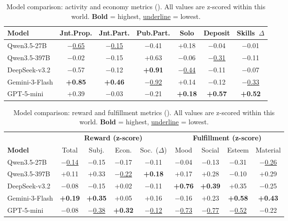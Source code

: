 \begin{table}[t]
\centering
\caption{Model comparison: activity and economy metrics (\campus{}).
All values are z-scored within this world.
\textbf{Bold} = highest, \underline{underline} = lowest.}
\label{tab:model_campus_activity}
\begin{tabular}{l c c c c c c}
\toprule
\textbf{Model} & Jnt.Prop. & Jnt.Part. & Pub.Part. & Solo & Deposit & Skills~$\Delta$ \\
\midrule
Qwen3.5-27B      & \underline{$-$0.65} & \underline{$-$0.15} & $-$0.41 & +0.18 & $-$0.04 & $-$0.01 \\
Qwen3.5-397B     & $-$0.02 & $-$0.15 & +0.63 & $-$0.06 & \underline{$-$0.31} & $-$0.11 \\
DeepSeek-v3.2    & $-$0.57 & $-$0.12 & \textbf{+0.91} & \underline{$-$0.44} & $-$0.11 & $-$0.07 \\
Gemini-3-Flash   & \textbf{+0.85} & \textbf{+0.46} & \underline{$-$0.92} & +0.14 & $-$0.12 & \underline{$-$0.33} \\
GPT-5-mini       & +0.39 & $-$0.03 & $-$0.21 & \textbf{+0.18} & \textbf{+0.57} & \textbf{+0.52} \\
\bottomrule
\end{tabular}
\end{table}

\begin{table}[t]
\centering
\caption{Model comparison: reward and fulfillment metrics (\academy{}).
All values are z-scored within this world.
\textbf{Bold} = highest, \underline{underline} = lowest.}
\label{tab:model_academy_reward}
\begin{tabular}{l c c c c | c c c c}
\toprule
& \multicolumn{4}{c}{\textbf{Reward (z-score)}}
& \multicolumn{4}{c}{\textbf{Fulfillment (z-score)}} \\
\cmidrule(lr){2-5} \cmidrule(l){6-9}
\textbf{Model} & Total & Subj. & Econ. & Soc.~($\Delta$) & Mood & Social & Esteem & Material \\
\midrule
Qwen3.5-27B      & \underline{$-$0.14} & $-$0.15 & $-$0.17 & $-$0.11 & $-$0.04 & $-$0.13 & $-$0.31 & \underline{$-$0.26} \\
Qwen3.5-397B     & +0.11 & +0.33 & \underline{$-$0.22} & \textbf{+0.18} & +0.17 & +0.28 & $-$0.10 & +0.29 \\
DeepSeek-v3.2    & $-$0.08 & $-$0.15 & +0.02 & $-$0.11 & \textbf{+0.76} & \textbf{+0.39} & +0.35 & $-$0.25 \\
Gemini-3-Flash   & \textbf{+0.19} & \textbf{+0.35} & +0.05 & +0.16 & $-$0.16 & +0.23 & \textbf{+0.58} & \textbf{+0.43} \\
GPT-5-mini       & $-$0.08 & \underline{$-$0.38} & \textbf{+0.32} & \underline{$-$0.12} & \underline{$-$0.73} & \underline{$-$0.77} & \underline{$-$0.52} & $-$0.22 \\
\bottomrule
\end{tabular}
\end{table}

